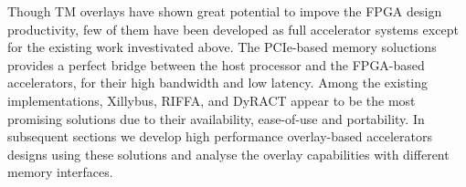 Though TM overlays have shown great potential to impove the FPGA design productivity, few of them have been developed as full accelerator systems except for the existing work investivated above. 
The PCIe-based memory soluctions provides a perfect bridge between the host processor and the FPGA-based accelerators, for their high bandwidth and low latency. 
Among the existing implementations, Xillybus, RIFFA, and DyRACT appear to be the most promising solutions due to their availability, ease-of-use and portability. 
In subsequent sections we develop high performance overlay-based accelerators designs using these solutions and analyse the overlay capabilities with different memory interfaces.


\begin{comment}
\begin{table}[tb]
	\caption{Theoretical bandwidth of typical memory interfaces.}
	\label{theo_bw}
	\centering
	\resizebox{\columnwidth}{!}{
		\begin{threeparttable}
			\begin{tabular}{lrrrcr}
				\toprule
				Interface & Frequency & Upstream BW & Downstream BW & Ports/Lanes & Total BW\tnote{1} \\ \midrule
				AXI HP    &   150 MHz &   1200 MB/s &     1200 MB/s &      4      &         9600 MB/s \\
				AXI ACP   &   150 MHz &   1200 MB/s &     1200 MB/s &      1      &         2400 MB/s \\
				PCIe Gen2 &   250 MHz &    500 MB/s &      500 MB/s &      8      &         8000 MB/s \\
				PCIe Gen3 &   250 MHz &    984 MB/s &      984 MB/s &      8      &        15800 MB/s \\ \bottomrule
			\end{tabular} 
			\begin{tablenotes}
				\item[1] In a streaming interface, the throughput is limited by either the upstream or downstream BW, depending on the number of inputs or outputs, and so the maximum theoretical throughput would be half of the total bandwidth reported here.
			\end{tablenotes}
		\end{threeparttable}
	}
\end{table}
\end{comment}
